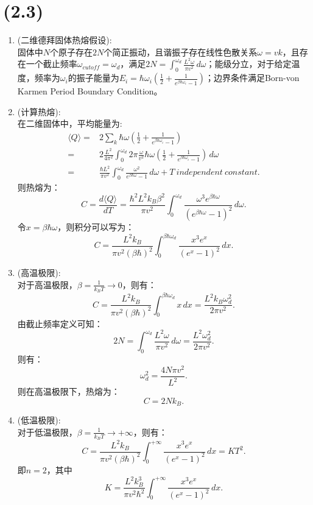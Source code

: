 \documentclass[reqno,a4paper,12pt]{amsart}
\begin{document}
\section{(2.3)}
\begin{enumerate}
	\item (二维德拜固体热熔假设):\\
	固体中$N$个原子存在$2N$个简正振动，且谐振子存在线性色散关系$\omega = v k$，且存在一个截止频率$\omega_{cutoff} = \omega_d$，满足$2N = \int_0^{\omega_{d}}\frac{L^2\omega}{\pi v^2}\,d\omega$；能级分立，对于给定温度，频率为$\omega_i$的振子能量为$E_i = \hbar\omega_i \left( \frac{1}{2} + \frac{1}{e^{\beta\hbar\omega_i} -  1} \right)$；边界条件满足Born-von Karmen Period Boundary Condition。
	
	\item (计算热熔): \\
	在二维固体中，平均能量为:
	\begin{equation*}
	\begin{aligned}
		\langle Q \rangle =& 2\sum_k \hbar\omega \left( \frac{1}{2} + \frac{1}{e^{\beta\hbar\omega_i} -  1} \right) \\
		=& 2\frac{L^2}{4\pi^2} \int_0^{\omega_d} 2\pi \frac{\omega}{v^2}\hbar\omega \left( \frac{1}{2} + \frac{1}{e^{\beta\hbar\omega_i} -  1} \right) \,d\omega \\
		=& \frac{\hbar L^2}{\pi v^2} \int_0^{\omega_d} \frac{\omega^2}{e^{\beta\hbar\omega} - 1}\,d\omega + T ~ independent ~ constant.
	\end{aligned}
	\end{equation*}
	则热熔为：
	\[
		C = \frac{d\langle Q \rangle}{dT} = \frac{\hbar^2L^2k_B\beta^2}{\pi v^2} \int_0^{\omega_d} \frac{\omega^3e^{\beta\hbar\omega}}{(e^{\beta\hbar\omega}-1)^2}\,d\omega.
	\]
	令$x = \beta\hbar\omega$，则积分可以写为：
	\[
		C = \frac{L^2k_B}{\pi v^2(\beta\hbar)^2} \int_0^{\beta\hbar\omega_d} \frac{x^3e^x}{(e^x - 1)^2}\,dx.
	\]
	
	\item (高温极限): \\
	对于高温极限，$\beta = \frac{1}{k_BT}\to 0$，则有：
	\[
		C = \frac{L^2k_B}{\pi v^2(\beta\hbar)^2} \int_0^{\beta\hbar\omega_d} x\,dx = \frac{L^2k_B\omega_d^2}{2\pi v^2}.
	\]
	由截止频率定义可知：
	\[
		2N = \int_0^{\omega_d} \frac{L^2\omega}{\pi v^2}\,d\omega = \frac{L^2\omega_d^2}{2\pi v^2}.
	\]
	则有：
	\[
		\omega_d^2 = \frac{4N\pi v^2}{L^2}.
	\]
	则在高温极限下，热熔为：
	\[
		C = 2Nk_B.
	\]
	
	\item (低温极限): \\
	对于低温极限，$\beta = \frac{1}{k_BT} \to +\infty$，则有：
	\[
		C = \frac{L^2k_B}{\pi v^2(\beta \hbar)^2} \int_0^{+\infty} \frac{x^3e^x}{(e^x - 1)^2}\,dx = KT^2.
	\]
	即$n = 2$，其中
	\[
		K = \frac{L^2k_B^3}{\pi v^2\hbar^2} \int_0^{+\infty} \frac{x^3e^x}{(e^x - 1)^2}\,dx.
	\]
\end{enumerate}
\end{document}
